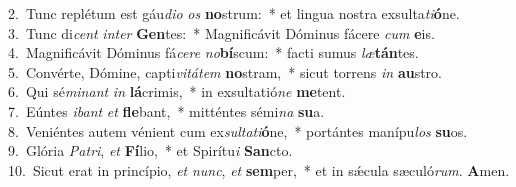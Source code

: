 {2.~}Tunc replétum est gáu\textit{di}\textit{o} \textit{os} \textbf{no}strum:~* et lingua nostra exsulta\textit{ti}\textbf{ó}ne.\\
{3.~}Tunc di\textit{cent} \textit{in}\textit{ter} \textbf{Gen}tes:~* Magnificávit Dóminus fácere \textit{cum} \textbf{e}is.\\
{4.~}Magnificávit Dóminus fá\textit{ce}\textit{re} \textit{no}\textbf{bí}scum:~* facti sumus \textit{læ}\textbf{tán}tes.\\
{5.~}Convérte, Dómine, capti\textit{vi}\textit{tá}\textit{tem} \textbf{no}stram,~* sicut torrens \textit{in} \textbf{au}stro.\\
{6.~}Qui sé\textit{mi}\textit{nant} \textit{in} \textbf{lá}crimis,~* in exsultatió\textit{ne} \textbf{me}tent.\\
{7.~}Eúntes \textit{i}\textit{bant} \textit{et} \textbf{fle}bant,~* mitténtes sémi\textit{na} \textbf{su}a.\\
{8.~}Veniéntes autem vénient cum ex\textit{sul}\textit{ta}\textit{ti}\textbf{ó}ne,~* portántes manípu\textit{los} \textbf{su}os.\\
{9.~}Glória \textit{Pa}\textit{tri}, \textit{et} \textbf{Fí}lio,~* et Spirítu\textit{i} \textbf{San}cto.\\
{10.~}Sicut erat in princípio, \textit{et} \textit{nunc}, \textit{et} \textbf{sem}per,~* et in sǽcula sæculó\textit{rum}. \textbf{A}men.\\
